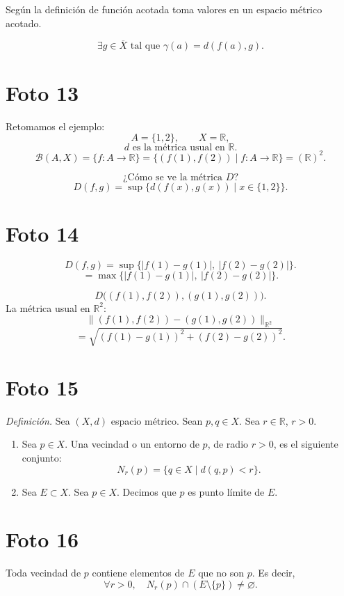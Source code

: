 \documentclass[12pt]{article}
\begin{document}
Según la definición de función acotada toma valores en un espacio métrico acotado.

\[
\exists g\in \overline X \text{ tal que } \gamma(a)=d(f(a),g).
\]

\section*{Foto 13}

Retomamos el ejemplo:
\[
A=\{1,2\},\qquad X=\mathbb R,
\]
\[
d \text{ es la métrica usual en } \mathbb R.
\]
\[
\mathcal B(A,X)=\{f:A\to\mathbb R\}=\{(f(1),f(2))\mid f:A\to\mathbb R\}=(\mathbb R)^2.
\]

\[
\text{¿Cómo se ve la métrica }D?
\]
\[
D(f,g)=\sup\{d(f(x),g(x))\mid x\in\{1,2\}\}.
\]

\section*{Foto 14}

\[
D(f,g)=\sup\{|f(1)-g(1)|,\ |f(2)-g(2)|\}.
\]
\[
=\max\{|f(1)-g(1)|,\ |f(2)-g(2)|\}.
\]

\[
D\bigl((f(1),f(2)),(g(1),g(2))\bigr).
\]
La métrica usual en $\mathbb R^2$:
\[
\bigl\|(f(1),f(2))-(g(1),g(2))\bigr\|_{\mathbb R^2}
\]
\[
=\sqrt{(f(1)-g(1))^2+(f(2)-g(2))^2}.
\]

\section*{Foto 15}

\textit{Definición.} Sea $(X,d)$ espacio métrico. Sean $p,q\in X$. Sea $r\in\mathbb R$, $r>0$.

\begin{enumerate}[label=\alph*)]
    \item Sea $p\in X$. Una vecindad o un entorno de $p$, de radio $r>0$, es el siguiente conjunto:
    \[
    N_r(p)=\{q\in X\mid d(q,p)<r\}.
    \]
    \item Sea $E\subset X$. Sea $p\in X$. Decimos que $p$ es punto límite de $E$.
\end{enumerate}

\section*{Foto 16}

Toda vecindad de $p$ contiene elementos de $E$ que no son $p$.
Es decir,
\[
\forall r>0,\quad N_r(p)\cap(E\setminus\{p\})\neq \varnothing.
\]
\end{document}
